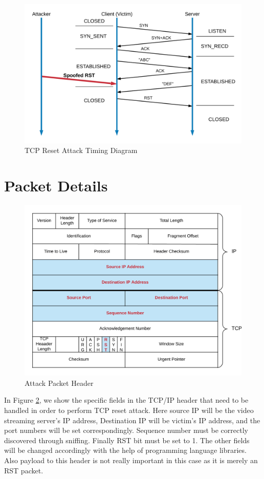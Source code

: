 \documentclass[14pt]{extarticle}
\begin{document}
    \begin{figure}[!h]
    	\centering
    	\includegraphics[width=.95\textwidth]{Pictures/TCP_RST_Timing_Diagram.png}
    	\caption{TCP Reset Attack Timing Diagram} 
    	\label{fig:RST_Attack_Tim}
    \end{figure}
    
\section{Packet Details}
    \begin{figure}
    	\centering
    	\includegraphics[width=.85\textwidth]{Pictures/TCP_IP_Packet.png}
    	\caption{Attack Packet Header} 
    	\label{fig:Attack_Packet}
    \end{figure}

    In Figure \ref{fig:Attack_Packet}, we show the specific fields in the TCP/IP header that need to be handled in order to perform TCP reset attack. Here source IP will be the video streaming server's IP address, Destination IP will be victim's IP address, and the port numbers will be set correspondingly. Sequence number must be correctly discovered through sniffing. Finally RST bit must be set to 1. The other fields will be changed accordingly with the help of programming language libraries. Also payload to this header is not really important in this case as it is merely an RST packet.
\end{document}
